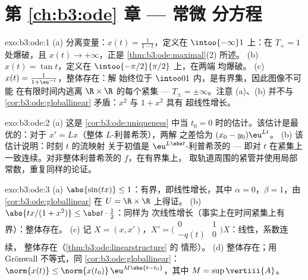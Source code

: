 \section*{第 \ref{ch:b3:ode} 章 --- 常微
分方程}

\begin{solution}{exo:b3:ode:1}
(a) 分离变量：$x(t) = \frac1{1 - t}$，定义在
$\intoo{-\infty}1$ 上：在 $T_+ = 1$ 处爆破，且 $x(t) \to
+\infty$，正是 \cref{thm:b3:ode:maximal}(2) 所述。
(b) $x(t) = \tan t$，定义在 $\intoo{-\pi/2}{\pi/2}$ 上，在两端
均爆破。
(c) $x(t) = \frac{1}{1 + \eu^{-t}}$，整体存在：解
始终位于 $\intoo01$ 内，是有界集，因此图像不可能
在有限时间内逃离 $\R\times\R$ 的每个紧集 --- $T_\pm
= \pm\infty$。注意 (a)、(b) 并不与
\cref{cor:b3:ode:globallinear} 矛盾：$x^2$ 与 $1 + x^2$ 具有
超线性增长。
\end{solution}

\begin{solution}{exo:b3:ode:2}
(a) 这是 \cref{cor:b3:ode:uniqueness} 中当 $t_0
= 0$ 时的估计。该估计是最优的：对于 $x' = Lx$（整体 $L$-利普希茨），两解
之差恰为 $(x_0 - y_0)\eu^{Lt}$。
(b) 该估计说明：时刻 $t$ 的流映射
关于初值是 $\eu^{L\abs t}$-利普希茨的 ---
即对 $t$ 在紧集上一致连续。对非整体利普希茨的
$f$，在有界集上，
取轨道周围的紧管并使用局部常数，重复同样的论证。
\end{solution}

\begin{solution}{exo:b3:ode:3}
(a) $\abs{\sin(tx)} \leq 1$：有界，即线性增长，其中
$\alpha = 0$，$\beta = 1$，由 \cref{cor:b3:ode:globallinear} 在
$U = \R\times\R$ 上得证。
(b) $\abs{tx/(1 + x^2)} \leq \abs t\cdot\frac12$：同样为
次线性增长（事实上在时间紧集上有界）：整体存在。
(c) 记 $X = (x, x')$，$X' = \bigl(\begin{smallmatrix}0 & 1\\ -q(t)
& 0\end{smallmatrix}\bigr)X$：线性，系数连续，
整体存在（\cref{thm:b3:ode:linearstructure} 的
情形）。
(d) 整体存在；用 Gr\"onwall 不等式，同 \cref{cor:b3:ode:globallinear}：
$\norm{x(t)} \leq \norm{x(t_0)}\,\eu^{M\abs{t - t_0}}$，其中
$M = \sup\vertiii{A}$。
\end{solution}

